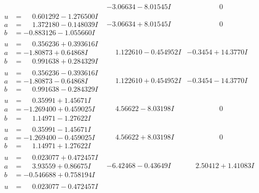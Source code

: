 \documentclass[1p]{elsarticle_modified}
\theoremstyle{definition}
\begin{document}
$$\begin{array}{c|c|c}
 & -3.06634 - 8.01545 I & \phantom{-0.000000 } 0 \\ \hline\begin{aligned}
u &= \phantom{-}0.601292 - 1.276500 I \\
a &= \phantom{-}1.372180 - 0.148039 I \\
b &= -0.883126 - 1.055660 I\end{aligned}
 & -3.06634 + 8.01545 I & \phantom{-0.000000 } 0 \\ \hline\begin{aligned}
u &= \phantom{-}0.356236 + 0.393616 I \\
a &= -1.80873 + 0.64868 I \\
b &= \phantom{-}0.991638 + 0.284329 I\end{aligned}
 & \phantom{-}1.122610 - 0.454952 I & -0.3454 + 14.3770 I \\ \hline\begin{aligned}
u &= \phantom{-}0.356236 - 0.393616 I \\
a &= -1.80873 - 0.64868 I \\
b &= \phantom{-}0.991638 - 0.284329 I\end{aligned}
 & \phantom{-}1.122610 + 0.454952 I & -0.3454 - 14.3770 I \\ \hline\begin{aligned}
u &= \phantom{-}0.35991 + 1.45671 I \\
a &= -1.269400 + 0.459025 I \\
b &= \phantom{-}1.14971 - 1.27622 I\end{aligned}
 & \phantom{-}4.56622 - 8.03198 I & \phantom{-0.000000 } 0 \\ \hline\begin{aligned}
u &= \phantom{-}0.35991 - 1.45671 I \\
a &= -1.269400 - 0.459025 I \\
b &= \phantom{-}1.14971 + 1.27622 I\end{aligned}
 & \phantom{-}4.56622 + 8.03198 I & \phantom{-0.000000 } 0 \\ \hline\begin{aligned}
u &= \phantom{-}0.023077 + 0.472457 I \\
a &= \phantom{-}3.93559 + 0.86675 I \\
b &= -0.546688 + 0.758194 I\end{aligned}
 & -6.42468 - 0.43649 I & \phantom{-}2.50412 + 1.41083 I \\ \hline\begin{aligned}
u &= \phantom{-}0.023077 - 0.472457 I \\

\end{aligned}
\end{array}$$
\end{document}
